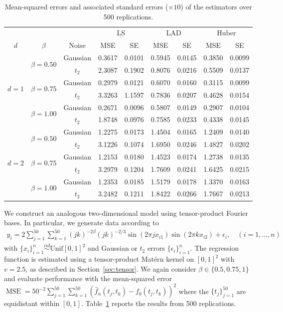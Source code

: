 \documentclass[11pt]{article}
\theoremstyle{definition}
\theoremstyle{remark}
\DeclareMathOperator{\MSE}{MSE}
\begin{document}
\begin{table}[H]
\centering
\begin{tabular}{ccccccccc}
\toprule
\multicolumn{3}{c}{ } & \multicolumn{2}{c}{LS} & \multicolumn{2}{c}{LAD} & \multicolumn{2}{c}{Huber} \\
\cmidrule(l{3pt}r{3pt}){4-5} \cmidrule(l{3pt}r{3pt}){6-7} \cmidrule(l{3pt}r{3pt}){8-9}
$d$ & $\beta$ & Noise & MSE & SE & MSE & SE & MSE & SE\\
\midrule
\multirow{6}{*}{$d = 1$} & \multirow{2}{*}{$\beta = 0.50$} & Gaussian & 0.3617 & 0.0101 & 0.5945 & 0.0145 & 0.3850 & 0.0099\\
 &  & $t_2$ & 2.3087 & 0.1902 & 0.8076 & 0.0216 & 0.5509 & 0.0137\\
 & \multirow{2}{*}{$\beta = 0.75$} & Gaussian & 0.2979 & 0.0121 & 0.6070 & 0.0160 & 0.3115 & 0.0099\\
 &  & $t_2$ & 3.3263 & 1.1597 & 0.7836 & 0.0207 & 0.4628 & 0.0154\\
 & \multirow{2}{*}{$\beta = 1.00$} & Gaussian & 0.2671 & 0.0096 & 0.5807 & 0.0149 & 0.2907 & 0.0104\\
 &  & $t_2$ & 1.8748 & 0.0976 & 0.7585 & 0.0233 & 0.4338 & 0.0145\\
\midrule
\multirow{6}{*}{$d = 2$} & \multirow{2}{*}{$\beta = 0.50$} & Gaussian & 1.2275 & 0.0173 & 1.4504 & 0.0165 & 1.2409 & 0.0140\\
 &  & $t_2$ & 3.1226 & 0.1074 & 1.6950 & 0.0246 & 1.4827 & 0.0202\\
 & \multirow{2}{*}{$\beta = 0.75$} & Gaussian & 1.2153 & 0.0180 & 1.4523 & 0.0174 & 1.2738 & 0.0135\\
 &  & $t_2$ & 3.2979 & 0.1204 & 1.7609 & 0.0241 & 1.6425 & 0.0215\\
 & \multirow{2}{*}{$\beta = 1.00$} & Gaussian & 1.2353 & 0.0185 & 1.5179 & 0.0178 & 1.3370 & 0.0163\\
 &  & $t_2$ & 3.2482 & 0.1211 & 1.8422 & 0.0266 & 1.7667 & 0.0213\\
\bottomrule
\end{tabular}
\caption{Mean-squared errors and associated standard errors ($\times 10$) of the estimators over 500 replications.}
\label{tab:1}
\end{table}
We construct an analogous two-dimensional model using tensor-product Fourier bases. In particular, we generate data according to
\begin{align*}
y_i = 2\sum_{j=1}^{50} \sum_{k=1}^{50} (jk)^{-2\beta} (jk)^{-2/3} \sin(2 \pi j x_{i1} ) \sin(2 \pi k x_{i2}) + \epsilon_i, \quad(i=1, \ldots, n)
\end{align*}
with $\{x_i\}_{i=1}^n \overset{iid}{\sim} \mathrm{Unif}[0,1]^2$ and  Gaussian or $t_2$ errors $\{\epsilon_i\}_{i=1}^n$. The regression function is estimated using a tensor-product Mat\'ern kernel on $[0,1]^2$ with $v=2.5$, as described in Section~\ref{sec:tensor}. We again consider $\beta \in \{0.5,0.75,1\}$ and evaluate performance with the mean-squared error $\MSE = 50^{-2} \sum_{j=1}^{50} \sum_{k=1}^{50} (\widehat{f}_n(t_j,t_k)-f_0(t_j,t_k))^2$ where the $\{t_{j}\}_{j=1}^{50}$ are equidistant within $[0,1]$. Table~\ref{tab:1} reports the results from 500 replications.
\end{document}
